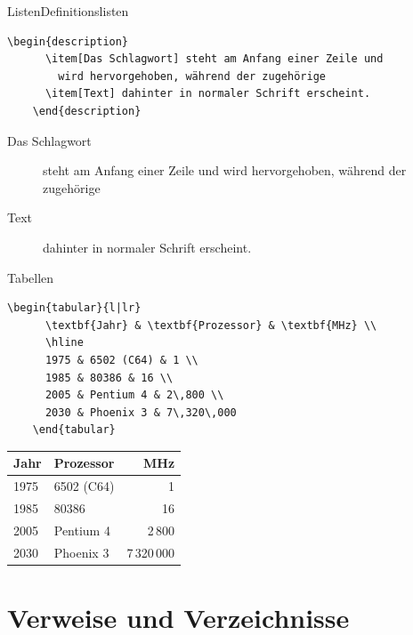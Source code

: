 \begin{Frame}[fragile]{Listen}{Definitionslisten}
  \begin{lstlisting}[gobble=4]
    \begin{description}
      \item[Das Schlagwort] steht am Anfang einer Zeile und
        wird hervorgehoben, während der zugehörige
      \item[Text] dahinter in normaler Schrift erscheint.
    \end{description}
  \end{lstlisting}

  \begin{description}
    \item[Das Schlagwort] steht am Anfang einer Zeile und wird
      hervorgehoben, während der zugehörige
    \item[Text] dahinter in normaler Schrift erscheint.
  \end{description}
\end{Frame}

\begin{Frame}[fragile]{Tabellen}
  \begin{lstlisting}[gobble=4]
    \begin{tabular}{l|lr}
      \textbf{Jahr} & \textbf{Prozessor} & \textbf{MHz} \\
      \hline
      1975 & 6502 (C64) & 1 \\
      1985 & 80386 & 16 \\
      2005 & Pentium 4 & 2\,800 \\
      2030 & Phoenix 3 & 7\,320\,000
    \end{tabular}
  \end{lstlisting}

  \begin{center}
    \begin{tabular}{l|lr}
      \textbf{Jahr} & \textbf{Prozessor} & \textbf{MHz} \\
      \hline
      1975 & 6502 (C64) & 1 \\
      1985 & 80386 & 16 \\
      2005 & Pentium 4 & 2\,800 \\
      2030 & Phoenix 3 & 7\,320\,000
    \end{tabular}
  \end{center}
\end{Frame}

\section{Verweise und Verzeichnisse}

